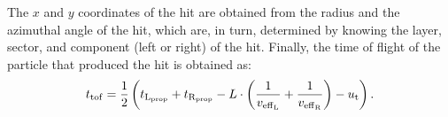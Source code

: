 The $x$ and $y$ coordinates of the hit are obtained from the radius and the azimuthal angle of the hit, which are, in turn, determined by knowing the layer, sector, and component (left or right) of the hit. 
Finally, the time of flight of the particle that produced the hit is obtained as:
\begin{equation}
t_{\rm{tof}}= \frac{1}{2}\left(t_{\rm{L}_{\rm{prop}}}+t_{\rm{R}_{\rm{prop}}}- L \cdot \left(\frac{1}{v_{\rm{eff}_{\rm{L}}}}+\frac{1}{v_{\rm{eff}_{\rm{R}}}}\right)  -u_{\rm{t}}\right).
\end{equation}

